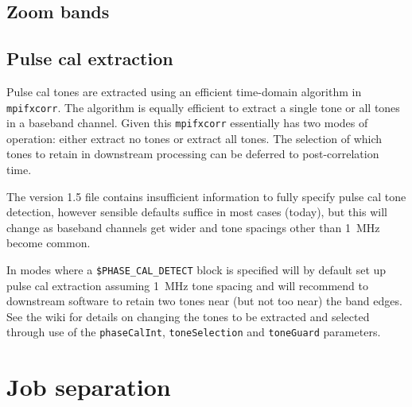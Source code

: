 \documentclass[12pt]{article}
\begin{document}
\subsection{Zoom bands}



\subsection{Pulse cal extraction}

Pulse cal tones are extracted using an efficient time-domain algorithm in {\tt mpifxcorr}.
The algorithm is equally efficient to extract a single tone or all tones in a baseband channel.
Given this {\tt mpifxcorr} essentially has two modes of operation: either extract no tones or extract all tones.
The selection of which tones to retain in downstream processing can be deferred to post-correlation time.

The version 1.5 \vx file contains insufficient information to fully specify pulse cal tone detection, however sensible defaults suffice in most cases (today), but this will change as baseband channels get wider and tone spacings other than 1~MHz become common. 

In modes where a {\tt \$PHASE\_CAL\_DETECT} block is specified \vexdifx will by default set up pulse cal extraction assuming 1~MHz tone spacing and will recommend to downstream software to retain two tones near (but not too near) the band edges.
See the \vexdifx wiki for details on changing the tones to be extracted and selected through use of the {\tt phaseCalInt}, {\tt toneSelection} and {\tt toneGuard} parameters.



\section{Job separation} \label{sec:break}
\end{document}
